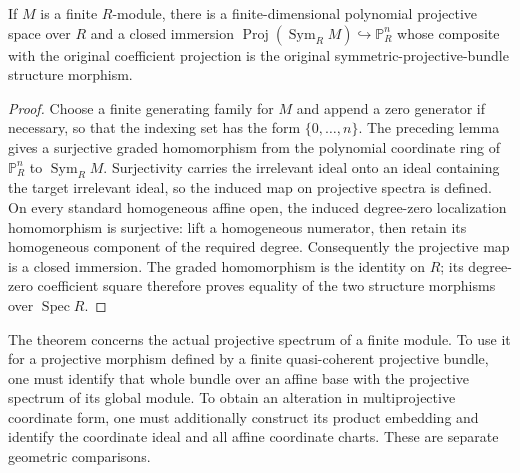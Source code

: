 \begin{theorem}
\label{thm:fc-symmetric-projective-embedding}
\leanok
{}
If $M$ is a finite $R$-module, there is a finite-dimensional polynomial
projective space over $R$ and a closed immersion
$\operatorname{Proj}(\operatorname{Sym}_R M)\hookrightarrow\mathbb P^n_R$
whose composite with the original coefficient projection is the
original symmetric-projective-bundle structure morphism.
\end{theorem}
\begin{proof}
Choose a finite generating family for $M$ and append a zero generator
if necessary, so that the indexing set has the form $\{0,\ldots,n\}$.
The preceding lemma gives a surjective graded homomorphism from the
polynomial coordinate ring of $\mathbb P^n_R$ to
$\operatorname{Sym}_R M$.  Surjectivity carries the irrelevant ideal
onto an ideal containing the target irrelevant ideal, so the induced
map on projective spectra is defined.  On every standard homogeneous
affine open, the induced degree-zero localization homomorphism is
surjective: lift a homogeneous numerator, then retain its homogeneous
component of the required degree.  Consequently the projective map
is a closed immersion.  The graded homomorphism is the identity on
$R$; its degree-zero coefficient square therefore proves equality of
the two structure morphisms over $\operatorname{Spec}R$.
\end{proof}

\begin{remark}
\label{rmk:fc-symmetric-embedding-alteration-comparison}
The theorem concerns the actual projective spectrum of a finite
module.  To use it for a projective morphism defined by a finite
quasi-coherent projective bundle, one must identify that whole bundle
over an affine base with the projective spectrum of its global
module.  To obtain an alteration in multiprojective coordinate form,
one must additionally construct its product embedding and identify
the coordinate ideal and all affine coordinate charts.  These are
separate geometric comparisons.
\end{remark}
